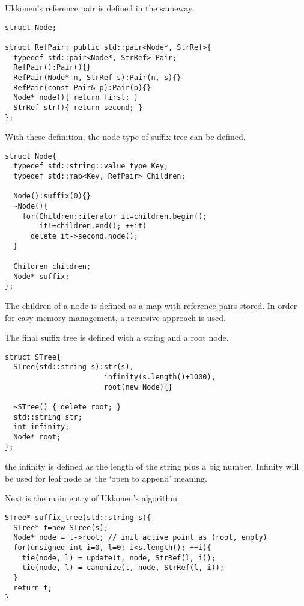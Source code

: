 \documentclass{article}
\begin{document}
Ukkonen's reference pair is defined in the sameway.

\begin{lstlisting}
struct Node;

struct RefPair: public std::pair<Node*, StrRef>{
  typedef std::pair<Node*, StrRef> Pair;
  RefPair():Pair(){}
  RefPair(Node* n, StrRef s):Pair(n, s){}
  RefPair(const Pair& p):Pair(p){}
  Node* node(){ return first; }
  StrRef str(){ return second; }
};
\end{lstlisting}

With these definition, the node type of suffix tree
can be defined.

\begin{lstlisting}
struct Node{
  typedef std::string::value_type Key;
  typedef std::map<Key, RefPair> Children;

  Node():suffix(0){}
  ~Node(){
    for(Children::iterator it=children.begin();
        it!=children.end(); ++it)
      delete it->second.node();
  }

  Children children;
  Node* suffix;
};
\end{lstlisting}

The children of a node is defined as a map with reference pairs stored.
In order for easy memory management, a recursive approach is used.

The final suffix tree is defined with a string and a root node.

\begin{lstlisting}
struct STree{
  STree(std::string s):str(s), 
                       infinity(s.length()+1000), 
                       root(new Node){}

  ~STree() { delete root; }
  std::string str;
  int infinity;
  Node* root;
};
\end{lstlisting}

the infinity is defined as the length of the string plus a big number.
Infinity will be used for leaf node as the `open to append' meaning.

Next is the main entry of Ukkonen's algorithm.

\begin{lstlisting}
STree* suffix_tree(std::string s){
  STree* t=new STree(s);
  Node* node = t->root; // init active point as (root, empty)
  for(unsigned int i=0, l=0; i<s.length(); ++i){
    tie(node, l) = update(t, node, StrRef(l, i));
    tie(node, l) = canonize(t, node, StrRef(l, i));
  }
  return t;
}
\end{lstlisting}
\end{document}

